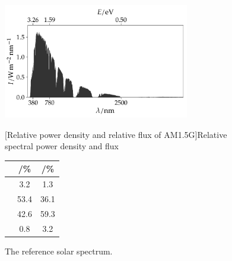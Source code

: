 \documentclass[draft,webedition,openright,titles,swedish,english]{LuaUUThesis}\usepackage[]{graphicx}\usepackage[]{xcolor}
\newenvironment{knitrout}{}{} %
\begin{document}
\begin{figure}[tbp]
\centering
\begin{minipage}[t]{0.68\textwidth}
\strut\vspace*{-\baselineskip}\newline
\centering
\begin{knitrout}\scriptsize
{}\color{fgcolor}

{\centering \includegraphics[width=3.20in]{figure/0100P-fig-solarspectrum-photoec-1} 

}


\end{knitrout}
\caption[The solar spectrum]{The \protect{} reference solar spectrum.}
\label{fig:solarspectrum-photoec}
\end{minipage}%
\hfill%
\begin{minipage}[t]{0.28\textwidth}%
\strut\vspace*{-\baselineskip}\newline
\centering
{}[Relative power density and relative flux of AM1.5G]{Relative spectral power density and flux}
\label{tab:solarspectrum-amounts}
\begin{tabular}{lS[table-format=2.1]S[table-format=2.1]}
  \toprule
{} & {/\unit{\percent}} & {/\unit{\percent}} \\ 
  \midrule
{} & 3.2 & 1.3 \\ 
   & 53.4 & 36.1 \\ 
   & 42.6 & 59.3 \\ 
   & 0.8 & 3.2 \\ 
   \bottomrule
\end{tabular}

\end{minipage}%
\end{figure}
\end{document}
